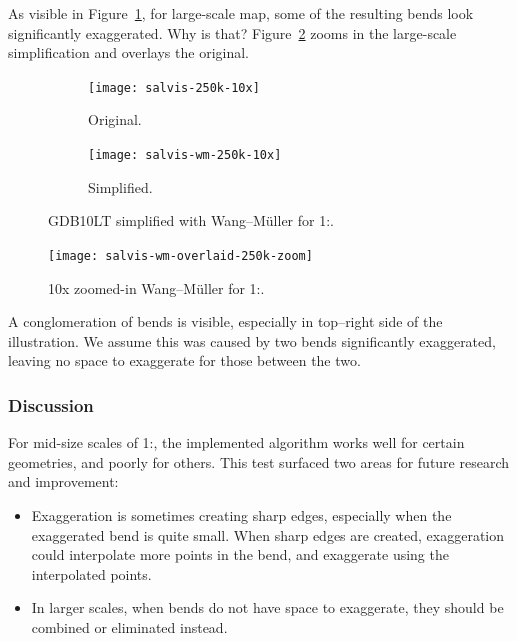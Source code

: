 \documentclass[a4paper]{article}
\newcommand{\WM}{Wang--M{\"u}ller}
\begin{document}
As visible in Figure~\ref{fig:salvis-wm-250k-10x}, for large-scale map, some of the
resulting bends look significantly exaggerated. Why is that?
Figure~\ref{fig:salvis-wm-250k-overlaid-zoom} zooms in the large-scale
simplification and overlays the original.

\begin{figure}[ht]
    \centering
    \begin{subfigure}[b]{.49\textwidth}
        \centering
        \texttt{[image: salvis-250k-10x]}
        \caption{Original.}
    \end{subfigure}
    \hfill
    \begin{subfigure}[b]{.49\textwidth}
        \centering
        \texttt{[image: salvis-wm-250k-10x]}
        \caption{Simplified.}
    \end{subfigure}
    \caption{GDB10LT simplified with {\WM} for 1:.}
    \label{fig:salvis-wm-250k-10x}
\end{figure}

\begin{figure}[ht]
    \centering
    \texttt{[image: salvis-wm-overlaid-250k-zoom]}
    \caption{10x zoomed-in {\WM} for 1:.}
    \label{fig:salvis-wm-250k-overlaid-zoom}
\end{figure}

A conglomeration of bends is visible, especially in top--right side of the
illustration. We assume this was caused by two bends significantly exaggerated,
leaving no space to exaggerate for those between the two.

\subsubsection{Discussion}

For mid-size scales of 1:, the implemented algorithm works well
for certain geometries, and poorly for others. This test surfaced two areas for
future research and improvement:

\begin{itemize}

    \item Exaggeration is sometimes creating sharp edges, especially when the
        exaggerated bend is quite small. When sharp edges are created,
        exaggeration could interpolate more points in the bend, and exaggerate
        using the interpolated points.

    \item In larger scales, when bends do not have space to exaggerate, they
        should be combined or eliminated instead.

\end{itemize}
\end{document}
